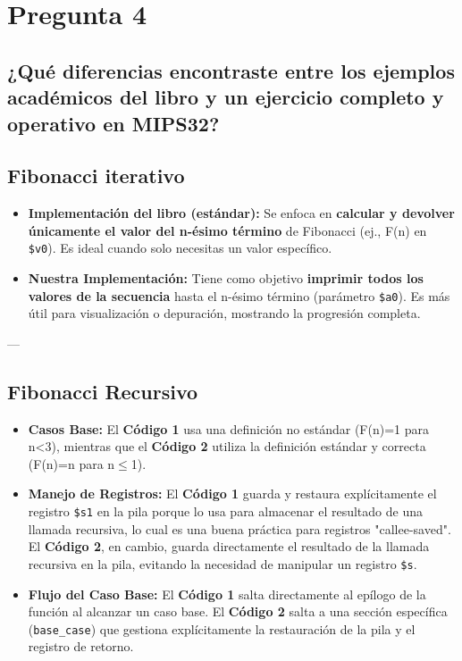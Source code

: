 \documentclass{article}
\begin{document}
\section*{Pregunta 4}

\subsection*{¿Qué diferencias encontraste entre los ejemplos académicos del libro y un ejercicio completo y operativo en MIPS32?}

\subsection*{Fibonacci iterativo}
\begin{itemize}
    \item \textbf{Implementación del libro (estándar):} Se enfoca en \textbf{calcular y devolver únicamente el valor del n-ésimo término} de Fibonacci (ej., F(n) en \texttt{\$v0}). Es ideal cuando solo necesitas un valor específico.
    \item \textbf{Nuestra Implementación:} Tiene como objetivo \textbf{imprimir todos los valores de la secuencia} hasta el n-ésimo término (parámetro \texttt{\$a0}). Es más útil para visualización o depuración, mostrando la progresión completa.
\end{itemize}

---

\subsection*{Fibonacci Recursivo}
\begin{itemize}
    \item \textbf{Casos Base:} El \textbf{Código 1} usa una definición no estándar (F(n)=1 para n<3), mientras que el \textbf{Código 2} utiliza la definición estándar y correcta (F(n)=n para n$\le$1).
    \item \textbf{Manejo de Registros:} El \textbf{Código 1} guarda y restaura explícitamente el registro \texttt{\$s1} en la pila porque lo usa para almacenar el resultado de una llamada recursiva, lo cual es una buena práctica para registros "callee-saved". El \textbf{Código 2}, en cambio, guarda directamente el resultado de la llamada recursiva en la pila, evitando la necesidad de manipular un registro \texttt{\$s}.
    \item \textbf{Flujo del Caso Base:} El \textbf{Código 1} salta directamente al epílogo de la función al alcanzar un caso base. El \textbf{Código 2} salta a una sección específica (\texttt{base\_case}) que gestiona explícitamente la restauración de la pila y el registro de retorno.
\end{itemize}
\end{document}
